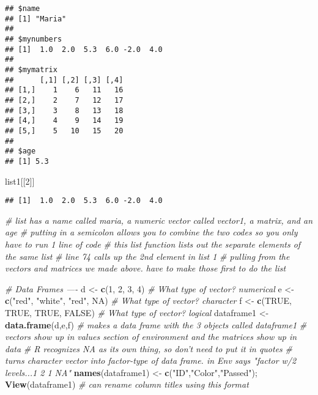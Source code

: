 \documentclass[]{article}
\newenvironment{Shaded}{\begin{snugshade}}{\end{snugshade}}
\newcommand{\KeywordTok}[1]{\textcolor[rgb]{0.13,0.29,0.53}{\textbf{#1}}}
\newcommand{\DecValTok}[1]{\textcolor[rgb]{0.00,0.00,0.81}{#1}}
\newcommand{\StringTok}[1]{\textcolor[rgb]{0.31,0.60,0.02}{#1}}
\newcommand{\CommentTok}[1]{\textcolor[rgb]{0.56,0.35,0.01}{\textit{#1}}}
\newcommand{\OtherTok}[1]{\textcolor[rgb]{0.56,0.35,0.01}{#1}}
\newcommand{\NormalTok}[1]{#1}
\begin{document}
\begin{verbatim}
## $name
## [1] "Maria"
## 
## $mynumbers
## [1]  1.0  2.0  5.3  6.0 -2.0  4.0
## 
## $mymatrix
##      [,1] [,2] [,3] [,4]
## [1,]    1    6   11   16
## [2,]    2    7   12   17
## [3,]    3    8   13   18
## [4,]    4    9   14   19
## [5,]    5   10   15   20
## 
## $age
## [1] 5.3
\end{verbatim}

\begin{Shaded}
\begin{Highlighting}[]
\NormalTok{list1[[}\DecValTok{2}\NormalTok{]]}
\end{Highlighting}
\end{Shaded}

\begin{verbatim}
## [1]  1.0  2.0  5.3  6.0 -2.0  4.0
\end{verbatim}

\begin{Shaded}
\begin{Highlighting}[]
\CommentTok{# list has a name called maria, a numeric vector called vector1, a matrix, and an age}
\CommentTok{# putting in a semicolon allows you to combine the two codes so you only have to run 1 line of code}
\CommentTok{# this list function lists out the separate elements of the same list}
\CommentTok{# line 74 calls up the 2nd element in list 1}
\CommentTok{# pulling from the vectors and matrices we made above. have to make those first to do the list}

\CommentTok{# Data Frames ----}
\NormalTok{d <-}\StringTok{ }\KeywordTok{c}\NormalTok{(}\DecValTok{1}\NormalTok{, }\DecValTok{2}\NormalTok{, }\DecValTok{3}\NormalTok{, }\DecValTok{4}\NormalTok{) }\CommentTok{# What type of vector? numerical}
\NormalTok{e <-}\StringTok{ }\KeywordTok{c}\NormalTok{(}\StringTok{"red"}\NormalTok{, }\StringTok{"white"}\NormalTok{, }\StringTok{"red"}\NormalTok{, }\OtherTok{NA}\NormalTok{) }\CommentTok{# What type of vector? character}
\NormalTok{f <-}\StringTok{ }\KeywordTok{c}\NormalTok{(}\OtherTok{TRUE}\NormalTok{, }\OtherTok{TRUE}\NormalTok{, }\OtherTok{TRUE}\NormalTok{, }\OtherTok{FALSE}\NormalTok{) }\CommentTok{# What type of vector? logical}
\NormalTok{dataframe1 <-}\StringTok{ }\KeywordTok{data.frame}\NormalTok{(d,e,f) }\CommentTok{# makes a data frame with the 3 objects called dataframe1}
\CommentTok{# vectors show up in values section of environment and the matrices show up in data}
\CommentTok{# R recognizes NA as its own thing, so don't need to put it in quotes}
\CommentTok{# turns character vector into factor-type of data frame. in Env says "factor w/2 levels...1 2 1 NA"}
\KeywordTok{names}\NormalTok{(dataframe1) <-}\StringTok{ }\KeywordTok{c}\NormalTok{(}\StringTok{"ID"}\NormalTok{,}\StringTok{"Color"}\NormalTok{,}\StringTok{"Passed"}\NormalTok{); }\KeywordTok{View}\NormalTok{(dataframe1) }\CommentTok{# can rename column titles using this format}
\end{Highlighting}
\end{Shaded}
\end{document}
